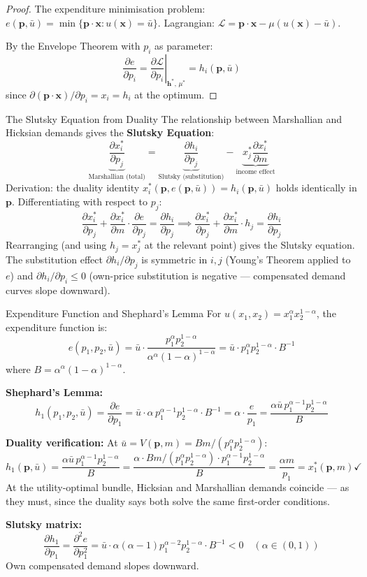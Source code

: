 \documentclass[12pt, a4paper]{article}
\theoremstyle{definition}
\newcommand{\bx}{\mathbf{x}}
\newcommand{\bp}{\mathbf{p}}
\newcommand{\pp}[2]{\dfrac{\partial #1}{\partial #2}}
\newcommand{\Lag}{\mathcal{L}}
\begin{document}
\begin{proof}
The expenditure minimisation problem:
$e(\bp,\bar u) = \min\{\bp\cdot\bx : u(\bx)=\bar u\}$.
Lagrangian: $\Lag = \bp\cdot\bx - \mu(u(\bx)-\bar u)$.

By the Envelope Theorem with $p_i$ as parameter:
\[
\frac{\partial e}{\partial p_i}
= \left.\frac{\partial \mathcal{L}}{\partial p_i}\right|_{\mathbf{h}^*,\,\mu^*}
= h_i(\mathbf{p},\bar{u})
\]
since $\partial(\bp\cdot\bx)/\partial p_i = x_i = h_i$ at the optimum.
\end{proof}
\newpage
\begin{keybox}{The Slutsky Equation from Duality}
The relationship between Marshallian and Hicksian demands gives the
\textbf{Slutsky Equation}:
\[
  \underbrace{\pp{x_i^*}{p_j}}_{\text{Marshallian (total)}}
  = \underbrace{\pp{h_i}{p_j}}_{\text{Slutsky (substitution)}}
    - \underbrace{x_j^*\pp{x_i^*}{m}}_{\text{income effect}}
\]
Derivation: the duality identity $x_i^*(\bp, e(\bp,\bar u)) = h_i(\bp,\bar u)$
holds identically in $\bp$. Differentiating with respect to $p_j$:
\[
  \pp{x_i^*}{p_j} + \pp{x_i^*}{m}\cdot\pp{e}{p_j}
  = \pp{h_i}{p_j}
  \implies \pp{x_i^*}{p_j} + \pp{x_i^*}{m}\cdot h_j
  = \pp{h_i}{p_j}
\]
Rearranging (and using $h_j = x_j^*$ at the relevant point) gives the
Slutsky equation. The substitution effect $\partial h_i/\partial p_j$ is
symmetric in $i,j$ (Young's Theorem applied to $e$) and $\partial h_i/\partial p_i \leq 0$
(own-price substitution is negative --- compensated demand curves slope downward).
\end{keybox}

\begin{exbox}{Expenditure Function and Shephard's Lemma}
For $u(x_1,x_2) = x_1^\alpha x_2^{1-\alpha}$, the expenditure function is:
\[
  e(p_1,p_2,\bar u)
  = \bar u \cdot \frac{p_1^\alpha p_2^{1-\alpha}}{\alpha^\alpha(1-\alpha)^{1-\alpha}}
  = \bar u\cdot p_1^\alpha p_2^{1-\alpha}\cdot B^{-1}
\]
where $B = \alpha^\alpha(1-\alpha)^{1-\alpha}$.

\textbf{Shephard's Lemma:}
\[
  h_1(p_1,p_2,\bar u)
  = \pp{e}{p_1}
  = \bar u\cdot\alpha\, p_1^{\alpha-1}p_2^{1-\alpha}\cdot B^{-1}
  = \alpha\cdot\frac{e}{p_1}
  = \frac{\alpha \bar u\,p_1^{\alpha-1}p_2^{1-\alpha}}{B}
\]

\textbf{Duality verification:} At $\bar u = V(\bp,m) = Bm/(p_1^\alpha p_2^{1-\alpha})$:
\[
  h_1(\bp,\bar u) = \frac{\alpha \bar u\, p_1^{\alpha-1}p_2^{1-\alpha}}{B}
  = \frac{\alpha\cdot Bm/(p_1^\alpha p_2^{1-\alpha})\cdot p_1^{\alpha-1}p_2^{1-\alpha}}{B}
  = \frac{\alpha m}{p_1}
  = x_1^*(\bp,m) \checkmark
\]
At the utility-optimal bundle, Hicksian and Marshallian demands coincide ---
as they must, since the duality says both solve the same first-order
conditions.

\textbf{Slutsky matrix:}
\[
  \pp{h_1}{p_1} = \pp{^2 e}{p_1^2}
  = \bar u\cdot\alpha(\alpha-1)p_1^{\alpha-2}p_2^{1-\alpha}\cdot B^{-1}
  < 0 \quad (\alpha\in(0,1))
\]
Own compensated demand slopes downward. \checkmark
\end{exbox}
\end{document}

